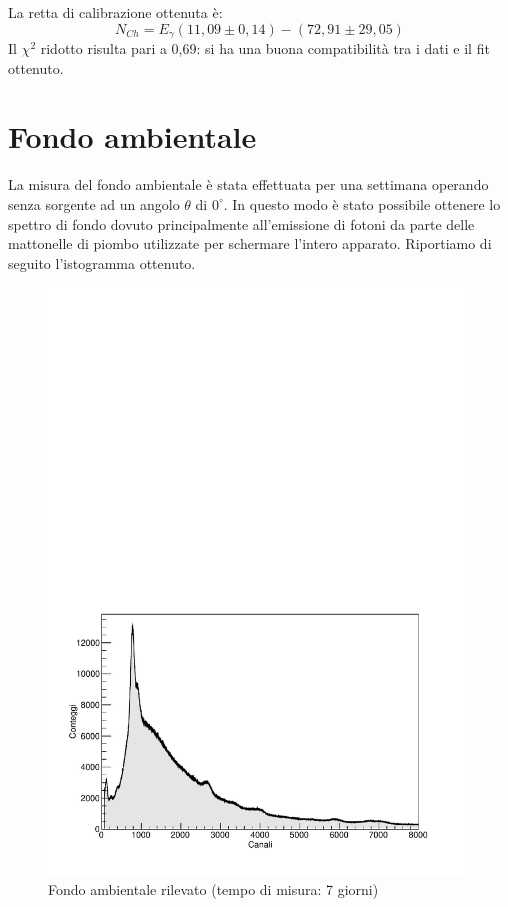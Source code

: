 \documentclass[italian,11pt]{report}
\begin{document}
\vspace{10cm}
La retta di calibrazione ottenuta è: $$N_{Ch}=E_{\gamma}(11,09\pm0,14)-(72,91\pm29,05)$$ Il $\chi^2$ ridotto risulta pari a 0,69: si ha una buona compatibilità tra i dati e il fit ottenuto.

\newpage
\section{Fondo ambientale}
La misura del fondo ambientale è stata effettuata per una settimana operando senza sorgente ad un angolo $\theta$ di $0^{\circ}$. In questo modo è stato possibile ottenere lo spettro di fondo dovuto principalmente all'emissione di fotoni da parte delle mattonelle di piombo utilizzate per schermare l'intero apparato. Riportiamo di seguito l'istogramma ottenuto.

\begin{figure}[htp]
\centering
\includegraphics[width=11cm]{fondo2.pdf}
\caption{Fondo ambientale rilevato (tempo di misura: 7 giorni)}
\end{figure}
\end{document}
